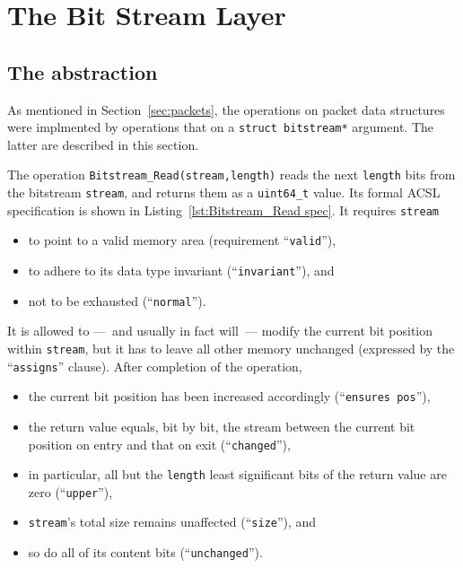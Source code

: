 

\FloatBarrier

\chapter{The Bit Stream Layer}
\label{cha:bitstream}









\section{The  abstraction}
\label{sec:bitstream}

As mentioned in Section~\ref{sec:packets},
the operations on packet data structures were implmented by 
operations that on a \lstinline{struct bitstream*} argument.
%
The latter are described in this section.

The operation 
\lstinline{Bitstream_Read(stream,length)}
reads the next \lstinline{length} bits from the bitstream
\lstinline{stream}, and returns them as a \lstinline{uint64_t} value.
%
Its formal ACSL specification is shown in 
Listing~\ref{lst:Bitstream_Read spec}.
%
It requires \lstinline{stream}
%
\begin{itemize}
\item to point to a valid memory area 
	(requirement ``\lstinline{valid}''),
\item to adhere to its data type invariant
	(``\lstinline{invariant}''), and
\item not to be exhausted (``\lstinline{normal}'').
\end{itemize}
%
It is allowed to ---~and usually in fact will~--- modify the current bit
position within \lstinline{stream}, but it has to leave all other memory
unchanged (expressed by the ``\lstinline{assigns}'' clause).
%
After completion of the operation, 
%
\begin{itemize}
\item the current bit position has been increased accordingly
	(``\lstinline{ensures pos}''),
\item the return value equals, bit by bit, the stream between the
	current bit position on entry and that on exit
	(``\lstinline{changed}''),
\item in particular, all but the \lstinline{length} least significant
	bits of the return value are zero
	(``\lstinline{upper}''),
\item \lstinline{stream}'s total size remains unaffected
	(``\lstinline{size}''), and
\item so do all of its content bits
	(``\lstinline{unchanged}'').
\end{itemize}




